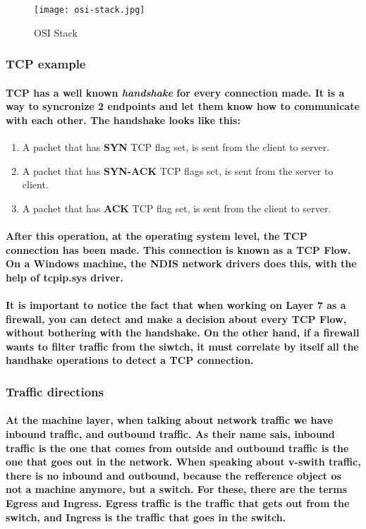 \begin{figure}[h]
\centering
\texttt{[image: osi-stack.jpg]}
\caption{OSI Stack}
\label{osi-stack}
\end{figure}

\subsubsection{TCP example}

\paragraph{TCP has a well known \textit{handshake} for every connection made. It is a way to syncronize 2 endpoints and let them know how to communicate with each other.
The handshake looks like this:}
\begin{enumerate}
\item A pachet that has \textbf{SYN} TCP flag set, is sent from the client to server.
\item A pachet that has \textbf{SYN-ACK} TCP flags set, is sent from the server to client.
\item A pachet that has \textbf{ACK} TCP flag set, is sent from the client to server.
\end{enumerate}
\paragraph{After this operation, at the operating system level, the TCP connection has been made. This connection is known as a \textbf{TCP Flow}. On a Windows machine,
the NDIS network drivers does this, with the help of tcpip.sys driver.}
\paragraph{It is important to notice the fact that when working on Layer 7 as a firewall, you can detect and make a decision about every TCP Flow, without bothering with
the handshake. On the other hand, if a firewall wants to filter traffic from the siwtch, it must correlate by itself all the handhake operations to detect a TCP connection.}

\subsubsection{Traffic directions}
\paragraph{At the machine layer, when talking about network traffic we have inbound traffic, and outbound traffic. As their name sais, inbound traffic is the one that comes from
outside and outbound traffic is the one that goes out in the network. When speaking about v-swith traffic, there is no inbound and outbound, because the refference object os not 
a machine anymore, but a switch. For these, there are the terms \textbf{Egress} and \textbf{Ingress}. \textbf{Egress} traffic is the traffic that gets out from the switch,
and \textbf{Ingress} is the traffic that goes in the switch. }


